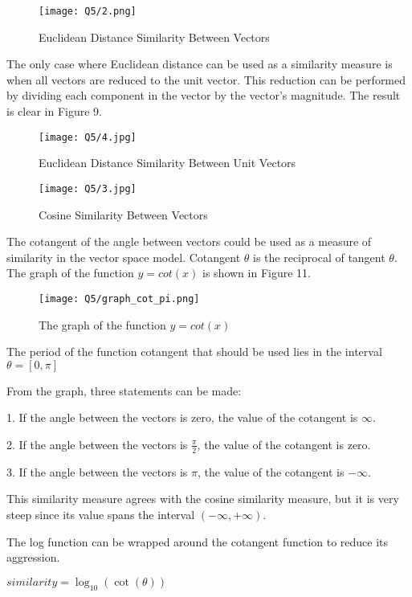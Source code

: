 \begin{figure}[h]
\caption{Euclidean Distance Similarity Between Vectors}
\centering
\texttt{[image: Q5/2.png]}
\end{figure}


The only case where Euclidean distance can be used as a similarity measure is when all vectors are reduced to the unit vector. This reduction can be performed by dividing each component in the vector by the vector's magnitude. The result is clear in Figure 9.

\begin{figure}[h]
\caption{Euclidean Distance Similarity Between Unit Vectors}
\centering
\texttt{[image: Q5/4.jpg]}
\end{figure}


\begin{figure}[h]
\caption{Cosine Similarity Between Vectors}
\centering
\texttt{[image: Q5/3.jpg]}
\end{figure}



The cotangent of the angle between vectors could be used as a measure of similarity in the vector space model. Cotangent $\theta$ is the reciprocal of tangent $\theta$. The graph of the function $y = cot(x)$ is shown in Figure 11.

\begin{figure}[h]
\caption{The graph of the function $y = cot(x)$}
\centering
\texttt{[image: Q5/graph\_cot\_pi.png]}
\end{figure}


The period of the function cotangent that should be used lies in the interval $\theta = [0,\pi]$

From the graph, three statements can be made:

1. If the angle between the vectors is zero, the value of the cotangent is $\infty$.

2. If the angle between the vectors is $\frac{\pi}{2}$, the value of the cotangent is zero.

3. If the angle between the vectors is $\pi$, the value of the cotangent is $-\infty$.

This similarity measure agrees with the cosine similarity measure, but it is very steep since its value spans the interval $(-\infty,+\infty)$.

The log function can be wrapped around the cotangent function to reduce its aggression. 

$ similarity = \log_{10} (\cot(\theta))$

